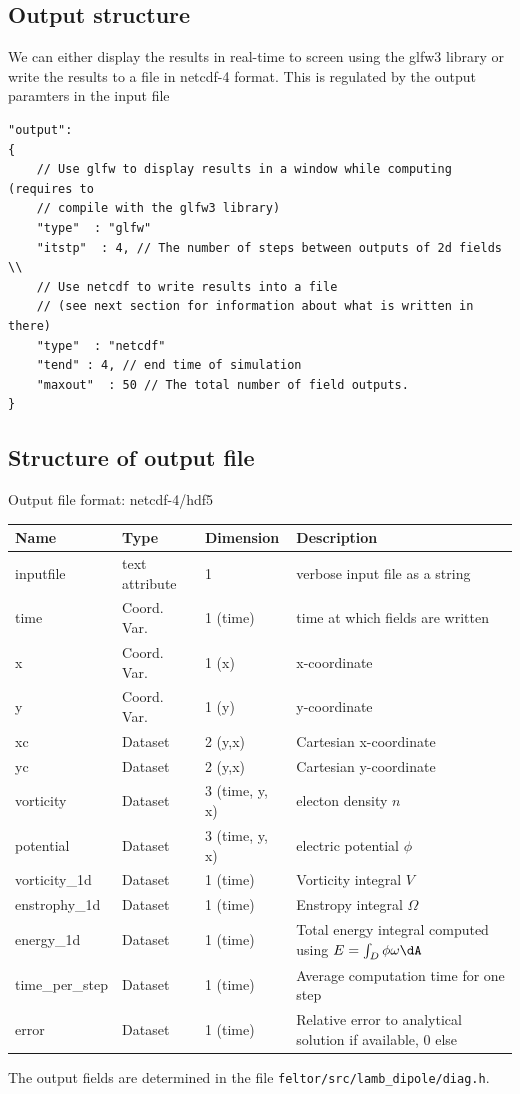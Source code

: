 \subsection{Output structure}

We can either display the results in real-time to screen using the glfw3 library or
write the results to a file in netcdf-4 format.
This is regulated by the output paramters in the input file
\begin{verbatim}
"output":
{
    // Use glfw to display results in a window while computing (requires to
    // compile with the glfw3 library)
    "type"  : "glfw"
    "itstp"  : 4, // The number of steps between outputs of 2d fields \\
    // Use netcdf to write results into a file
    // (see next section for information about what is written in there)
    "type"  : "netcdf"
    "tend" : 4, // end time of simulation
    "maxout"  : 50 // The total number of field outputs.
}
\end{verbatim}
\subsection{Structure of output file}
Output file format: netcdf-4/hdf5
%
\begin{longtable}{lll>{\RaggedRight}p{7cm}}
\toprule
\rowcolor{gray!50}\textbf{Name} &  \textbf{Type} & \textbf{Dimension} & \textbf{Description}  \\ \midrule
inputfile  &             text attribute & 1 & verbose input file as a string \\
time                     & Coord. Var. & 1 (time) & time at which fields are written \\
x                        & Coord. Var. & 1 (x) & x-coordinate  \\
y                        & Coord. Var. & 1 (y) & y-coordinate \\
xc                       & Dataset & 2 (y,x) & Cartesian x-coordinate  \\
yc                       & Dataset & 2 (y,x) & Cartesian y-coordinate \\
vorticity                & Dataset & 3 (time, y, x) & electon density $n$ \\
potential                & Dataset & 3 (time, y, x) & electric potential $\phi$  \\
vorticity\_1d            & Dataset & 1 (time) & Vorticity integral $V$  \\
enstrophy\_1d            & Dataset & 1 (time) & Enstropy integral $\Omega$  \\
energy\_1d               & Dataset & 1 (time) & Total energy integral computed using $E = \int_D \phi\omega \dA$ \\
time\_per\_step          & Dataset & 1 (time) & Average computation time for one step \\
error                    & Dataset & 1 (time) & Relative error to analytical solution if available, 0 else \\
\bottomrule
\end{longtable}
The output fields are determined in the file \texttt{feltor/src/lamb\_dipole/diag.h}.





